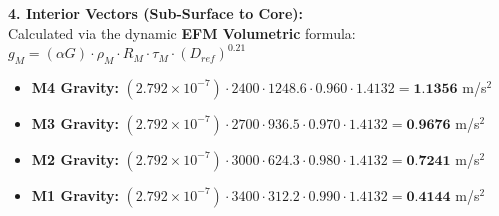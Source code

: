 \documentclass[11pt, a4paper]{article}
\begin{document}
  \vspace{0.5em}
  \noindent \textbf{4. Interior Vectors (Sub-Surface to Core):} \\[0.5em]
  \hspace*{1em} Calculated via the dynamic \textbf{EFM Volumetric} formula: $g_M = (\alpha G) \cdot \rho_{M} \cdot R_M \cdot \tau_M \cdot (D_{ref})^{0.21}$
  \begin{itemize}
    \item \textbf{M4 Gravity:} $(2.792 \times 10^{-7}) \cdot 2400 \cdot 1248.6 \cdot 0.960 \cdot 1.4132 = \textbf{1.1356}$ m/s$^2$
    \item \textbf{M3 Gravity:} $(2.792 \times 10^{-7}) \cdot 2700 \cdot 936.5 \cdot 0.970 \cdot 1.4132 = \textbf{0.9676}$ m/s$^2$
    \item \textbf{M2 Gravity:} $(2.792 \times 10^{-7}) \cdot 3000 \cdot 624.3 \cdot 0.980 \cdot 1.4132 = \textbf{0.7241}$ m/s$^2$
    \item \textbf{M1 Gravity:} $(2.792 \times 10^{-7}) \cdot 3400 \cdot 312.2 \cdot 0.990 \cdot 1.4132 = \textbf{0.4144}$ m/s$^2$
  \end{itemize}
\end{document}
